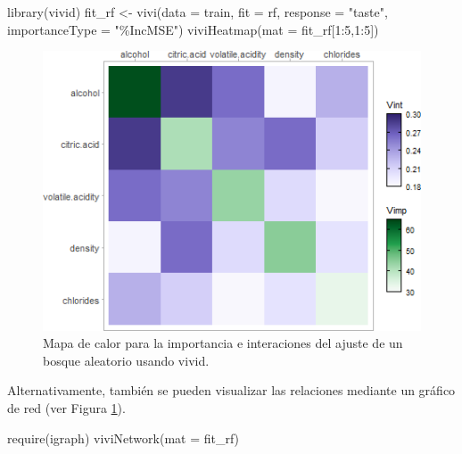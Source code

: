 \documentclass[
  spanish,
]{book}
\newenvironment{Shaded}{\begin{snugshade}}{\end{snugshade}}
\newcommand{\AttributeTok}[1]{\textcolor[rgb]{0.77,0.63,0.00}{#1}}
\newcommand{\DecValTok}[1]{\textcolor[rgb]{0.00,0.00,0.81}{#1}}
\newcommand{\FunctionTok}[1]{\textcolor[rgb]{0.00,0.00,0.00}{#1}}
\newcommand{\NormalTok}[1]{#1}
\newcommand{\OtherTok}[1]{\textcolor[rgb]{0.56,0.35,0.01}{#1}}
\newcommand{\SpecialCharTok}[1]{\textcolor[rgb]{0.00,0.00,0.00}{#1}}
\newcommand{\StringTok}[1]{\textcolor[rgb]{0.31,0.60,0.02}{#1}}
\theoremstyle{break}
\theoremstyle{definition}
\theoremstyle{definition}
\theoremstyle{definition}
\theoremstyle{definition}
\theoremstyle{remark}
\begin{document}
\begin{Shaded}
\begin{Highlighting}[]
\FunctionTok{library}\NormalTok{(vivid)}
\NormalTok{fit\_rf  }\OtherTok{\textless{}{-}} \FunctionTok{vivi}\NormalTok{(}\AttributeTok{data =}\NormalTok{ train, }\AttributeTok{fit =}\NormalTok{ rf, }\AttributeTok{response =} \StringTok{"taste"}\NormalTok{, }\AttributeTok{importanceType =} \StringTok{"\%IncMSE"}\NormalTok{)}
\FunctionTok{viviHeatmap}\NormalTok{(}\AttributeTok{mat =}\NormalTok{ fit\_rf[}\DecValTok{1}\SpecialCharTok{:}\DecValTok{5}\NormalTok{,}\DecValTok{1}\SpecialCharTok{:}\DecValTok{5}\NormalTok{])}
\end{Highlighting}
\end{Shaded}

\begin{figure}[!htb]

{\centering \includegraphics[width=0.8\linewidth]{images/rf-vivid-1} 

}

\caption{Mapa de calor para la importancia e interaciones del ajuste de un bosque aleatorio usando vivid.}\label{fig:rf-vivid-plot}
\end{figure}

Alternativamente, también se pueden visualizar las relaciones mediante un gráfico de red (ver Figura \ref{fig:rf-vivid-plot}).

\begin{Shaded}
\begin{Highlighting}[]
\FunctionTok{require}\NormalTok{(igraph)}
\FunctionTok{viviNetwork}\NormalTok{(}\AttributeTok{mat =}\NormalTok{ fit\_rf)}
\end{Highlighting}
\end{Shaded}
\end{document}

